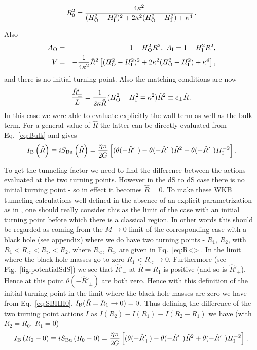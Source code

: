 \documentclass[a4paper,11pt]{article}
\numberwithin{equation}{section}
\newcommand{\be}{\begin{equation}}
\newcommand{\ee}{\end{equation}}
\numberwithin{equation}{section}
\begin{document}
\be
R_{0}^{2}  = \frac{4\kappa^{2}}{(H_{{\rm O}}^{2}-H_{{\rm I}}^{2})^{2}+2\kappa^{2}(H_{{\rm O}}^{2}+H_{{\rm I}}^{2})+\kappa^{4}} \,.\label{eq:RoHH}  
\ee

Also
\begin{eqnarray}
A_{{\rm O}} & = & 1-H_{{\rm O}}^{2}R^{2},\,\,A_{{\rm I}}=1-H_{{\rm I}}^{2}R^{2},\label{eq:AOIHH}\\
V & = & -\frac{1}{4\kappa^{2}}\hat{R}^{2}\left[(H_{{\rm O}}^{2}-H_{{\rm I}}^{2})^{2}+2\kappa^{2}(H_{{\rm O}}^{2}+H_{{\rm I}}^{2})+\kappa^{4}\right],\label{eq:VHH}
\end{eqnarray}
and there is no initial turning point. Also the matching conditions
are now
\begin{equation}
\frac{\hat{R}'_{\pm}}{L}=\frac{1}{2\kappa\hat{R}}(H_{{\rm O}}^{2}-H_{{\rm I}}^{2}\mp\kappa^{2})\hat{R}^{2}\equiv c_{\pm}\hat{R}\,. \label{eq:R'HH}
\end{equation}
 In this case we were able to evaluate explicitly the wall term as well as the 
 bulk term. For a general value
of $\hat{R}$ the latter  can be directly evaluated from Eq.~\eqref{eq:Bulk} and gives 
\begin{equation}
I_{{\rm B}}\left(\hat{R}\right)\equiv iS_{{\rm Bu}}\left(\hat{R}\right)=\frac{\eta\pi}{2G}\left[(\theta(-\hat{R}'_{+})-\theta(-\hat{R}'_{-})\hat{R}^{2}+\theta(-\hat{R}'_{-})H_{{\rm I}}^{-2}\right]\label{eq:SBHH0}.
\end{equation}

To get the tunneling factor we need to find the difference between the actions evaluated at the two turning points. However in the dS to dS case there is no initial turning point - so in effect it becomes $\hat R=0$. To make these WKB tunneling calculations well defined in the absence of an explicit parametrization as in \cite{DeAlwis:2019rxg}, one should really consider this as the limit of the case with   an initial turning point before which there is a classical region. In other words this should be regarded as coming from the $M\rightarrow 0$ limit of the corresponding case with a black hole (see appendix) where we do have two turning points - $R_1$, $R_2$, with 
$R_{1}<R_{<}<R_{>}<R_{2}$, where $R_<$, $R_>$ are given in Eq.~\eqref{eq:R<>}. In the limit where the black hole masses go to zero $R_{1}<R_{<}\rightarrow 0$. Furthermore (see Fig.~\ref{fig:potentialSdS}) we see that $\hat R'_-$ at $\hat R = R_1$ is positive (and so is  $\hat R'_+$). Hence 
at this point  $\theta(-\hat R'_{\pm})$ are both zero. Hence with this definition of the initial turning point in the limit where the black hole masses are zero we have from Eq.~\eqref{eq:SBHH0}, $I_{{\rm B}}(\hat{R}=R_1\rightarrow 0)=0$. Thus defining the difference of the two turning point actions $I$ as $I(R_2)-I(R_1)\equiv I(R_2-R_1)$
 we have (with $R_2=R_0,~R_1=0$)
 \begin{equation}
I_{{\rm B}}\left({R_0-0}\right)\equiv iS_{{\rm Bu}}\left({R_0}-0\right)=\frac{\eta\pi}{2G}\left[(\theta(-\hat{R}'_{+})-\theta(-\hat{R}'_{-})\hat{R}^{2}+\theta(-\hat{R}'_{-})H_{{\rm I}}^{-2}\right] \,.\label{eq:SBHH1}
\end{equation}
\end{document}
